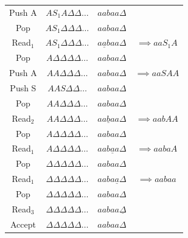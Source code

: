 \documentclass[letterpaper, 12 pt]{article}
\begin{document}
\begin{enumerate}
\begin{center}
\begin{tabular}{| c | c | c | c |}
                Push A     & $A      S_1    A      \Delta \Delta \dots   $ & $aabaa               \Delta               $ & \\
                Pop        & $A      S_1    \Delta \Delta \Delta \dots   $ & $aabaa               \Delta               $ & \\
                Read$_1$   & $A      S_1    \Delta \Delta \Delta \dots   $ & $a\underline{a}baa   \Delta               $ & $\implies   aaS_1A$           \\
                Pop        & $A      \Delta \Delta \Delta \Delta \dots   $ & $aabaa               \Delta               $ & \\
                Push A     & $A      A      \Delta \Delta \Delta \dots   $ & $aabaa               \Delta               $ & $\implies   aaSAA$            \\
                Push S     & $A      A      S      \Delta \Delta \dots   $ & $aabaa               \Delta               $ & \\
                Pop        & $A      A      \Delta \Delta \Delta \dots   $ & $aabaa               \Delta               $ & \\
                Read$_2$   & $A      A      \Delta \Delta \Delta \dots   $ & $aa\underline{b}aa   \Delta               $ & $\implies   aabAA$            \\
                Pop        & $A      \Delta \Delta \Delta \Delta \dots   $ & $aabaa               \Delta               $ & \\
                Read$_1$   & $A      \Delta \Delta \Delta \Delta \dots   $ & $aab\underline{a}a   \Delta               $ & $\implies   aabaA$            \\
                Pop        & $\Delta \Delta \Delta \Delta \Delta \dots   $ & $aabaa               \Delta               $ & \\
                Read$_1$   & $\Delta \Delta \Delta \Delta \Delta \dots   $ & $aaba\underline{a}   \Delta               $ & $\implies   aabaa$            \\
                Pop        & $\Delta \Delta \Delta \Delta \Delta \dots   $ & $aabaa               \Delta               $ & \\
                Read$_3$   & $\Delta \Delta \Delta \Delta \Delta \dots   $ & $aabaa               \underline{\Delta}   $ & \\
                Accept     & $\Delta \Delta \Delta \Delta \Delta \dots   $ & $aabaa               \Delta               $ & \\
                \hline
            \end{tabular}
        \end{center}


\end{enumerate}
\end{document}
